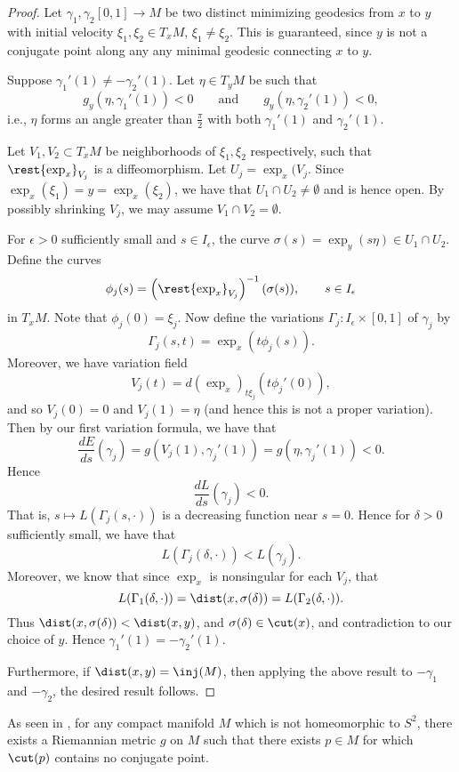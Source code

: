\begin{proof}
Let $\gamma_1,\gamma_2[0,1]\to M$ be two distinct minimizing geodesics from $x$ to $y$ with initial velocity $\xi_1,\xi_2\in T_xM$, $\xi_1\neq\xi_2$.  This is guaranteed, since $y$ is not a conjugate point along any any minimal geodesic connecting $x$ to $y$.

Suppose $\gamma_1'(1)\neq-\gamma_2'(1)$.  Let $\eta\in T_yM$ be such that
$$g_y(\eta,\gamma_1'(1))<0\qquad\text{and}\qquad g_y(\eta,\gamma_2'(1))<0,$$
i.e., $\eta$ forms an angle greater than $\frac{\pi}{2}$ with both $\gamma_1'(1)$ and $\gamma_2'(1)$.

Let $V_1, V_2\subset T_xM$ be neighborhoods of $\xi_1,\xi_2$ respectively, such that $\rest{\exp_x}_{V_j}$ is a diffeomorphism. Let $U_j=\exp_x(V_j$.  Since $\exp_x(\xi_1)=y=\exp_x(\xi_2)$, we have that $U_1\cap U_2\neq\emptyset$ and is hence open. By possibly shrinking $V_j$, we may assume $V_1\cap V_2=\emptyset$.

For $\epsilon>0$ sufficiently small and $s\in I_\epsilon$, the curve $\sigma(s)=\exp_y(s\eta)\in U_1\cap U_2$.  Define the curves
$$\phi_j(s)=\left(\rest{\exp_x}_{V_j}\right)^{-1}(\sigma(s)),\qquad s\in I_\epsilon$$
in $T_xM$.  Note that $\phi_j(0)=\xi_j$. Now define the variations $\Gamma_j:I_\epsilon\times[0,1]$ of $\gamma_j$ by
$$\Gamma_j(s,t)=\exp_x(t\phi_j(s)).$$
Moreover, we have variation field
$$V_j(t)=d(\exp_x)_{t\xi_j}(t\phi_j'(0)),$$
and so $V_j(0)=0$ and $V_j(1)=\eta$ (and hence this is not a proper variation).  Then by our first variation formula, we have that
$$\frac{dE}{ds}(\gamma_j)=g(V_j(1),\gamma_j'(1))=g(\eta,\gamma_j'(1))<0.$$
Hence
$$\frac{dL}{ds}(\gamma_j)<0.$$
That is, $s\mapsto L(\Gamma_j(s,\cdot))$ is a decreasing function near $s=0$.  Hence for $\delta>0$ sufficiently small, we have that
$$L(\Gamma_j(\delta,\cdot))<L(\gamma_j).$$
Moreover, we know that since $\exp_x$ is nonsingular for each $V_j$, that
$$L(\Gamma_1(\delta,\cdot))=\dist(x,\sigma(\delta))=L(\Gamma_2(\delta,\cdot)).$$
Thus $\dist(x,\sigma(\delta))<\dist(x,y)$, and $\sigma(\delta)\in\cut(x)$, and contradiction to our choice of $y$.  Hence $\gamma_1'(1)=-\gamma_2'(1)$.

Furthermore, if $\dist(x,y)=\inj(M)$, then applying the above result to $-\gamma_1$ and $-\gamma_2$, the desired result follows.
\end{proof}

As seen in \cite{weinstein1968cut}, for any compact manifold $M$ which is not homeomorphic to $S^2$, there exists a Riemannian metric $g$ on $M$ such that there exists $p\in M$ for which $\cut(p)$ contains no conjugate point.





